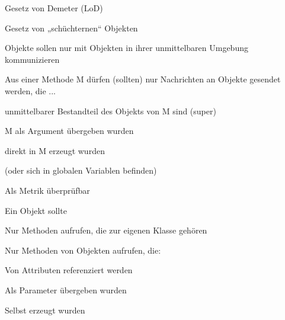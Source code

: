 \documentclass[a4paper]{article}
\begin{document}
\begin{multicols}{3}
  Gesetz von Demeter (LoD)
  \begin{itemize*}
    \item Gesetz von „schüchternen“ Objekten
    \item Objekte sollen nur mit Objekten in ihrer unmittelbaren Umgebung kommunizieren
    \item Aus einer Methode M dürfen (sollten) nur Nachrichten an Objekte gesendet werden, die ...
    \begin{itemize*}
      \item unmittelbarer Bestandteil des Objekts von M sind (super)
      \item M als Argument übergeben wurden
      \item direkt in M erzeugt wurden
      \item (oder sich in globalen Variablen befinden)
    \end{itemize*}
    \item Als Metrik überprüfbar
  \end{itemize*}

  Ein Objekt sollte
  \begin{itemize*}
    \item Nur Methoden aufrufen, die zur eigenen Klasse gehören
    \item Nur Methoden von Objekten aufrufen, die:
    \begin{itemize*}
      \item Von Attributen referenziert werden
      \item Als Parameter übergeben wurden
      \item Selbst erzeugt wurden
    \end{itemize*}
  \end{itemize*}



\end{multicols}
\end{document}
